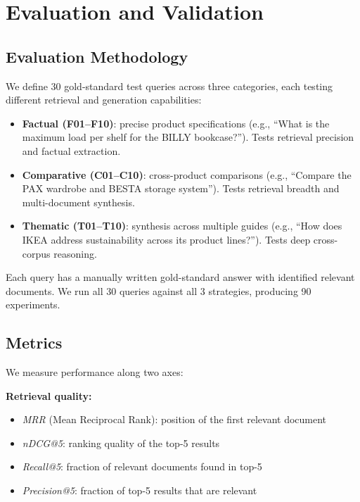 \documentclass[conference]{IEEEtran}
\begin{document}
\section{Evaluation and Validation}

\subsection{Evaluation Methodology}

We define 30 gold-standard test queries across three categories, each testing different retrieval and generation capabilities:

\begin{itemize}
    \item \textbf{Factual (F01--F10)}: precise product specifications (e.g., ``What is the maximum load per shelf for the BILLY bookcase?''). Tests retrieval precision and factual extraction.
    \item \textbf{Comparative (C01--C10)}: cross-product comparisons (e.g., ``Compare the PAX wardrobe and BESTA storage system''). Tests retrieval breadth and multi-document synthesis.
    \item \textbf{Thematic (T01--T10)}: synthesis across multiple guides (e.g., ``How does IKEA address sustainability across its product lines?''). Tests deep cross-corpus reasoning.
\end{itemize}

Each query has a manually written gold-standard answer with identified relevant documents. We run all 30 queries against all 3 strategies, producing 90 experiments.

\subsection{Metrics}

We measure performance along two axes:

\textbf{Retrieval quality:}
\begin{itemize}
    \item \textit{MRR} (Mean Reciprocal Rank): position of the first relevant document
    \item \textit{nDCG@5}: ranking quality of the top-5 results
    \item \textit{Recall@5}: fraction of relevant documents found in top-5
    \item \textit{Precision@5}: fraction of top-5 results that are relevant
\end{itemize}
\end{document}
